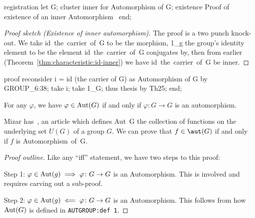 \nwenddocs{}\endmoddef\nwstartdeflinemarkup{}\nwenddeflinemarkup
registration
  let G;
  cluster inner for Automorphism of G;
  existence
  \LA{}Proof of existence of an inner Automorphism~{\nwtagstyle{}}\RA{}
end;
\nwendcode{}\nwdocspar

\begin{proof}[Proof sketch (Existence of inner automorphism)]
The proof is a two punch knock-out. We take {\Tt{}id\ the\ carrier\ of\ G\nwendquote} to be the
morphism, {\Tt{}1{\_}g\nwendquote} the group's identity element to be the element
{\Tt{}id\ the\ carrier\ of\ G\nwendquote} conjugates by, then from earlier (Theorem~\ref{thm:characteristic:id-inner})
we have {\Tt{}id\ the\ carrier\ of\ G\nwendquote} be inner.
\end{proof}

\nwenddocs{}\endmoddef\nwstartdeflinemarkup{}\nwenddeflinemarkup
proof
  reconsider i = id (the carrier of G) as Automorphism of G by GROUP_6:38;
  take i;
  take 1_G;
  thus thesis by Th25;
end;
\nwendcode{}\nwdocspar

\begin{theorem}
For any $\varphi$, we have $\varphi\in\operatorname{Aut}(G)$ if and only if
$\varphi\colon G\to G$ is an automorphism.
\end{theorem}

\begin{thm-remark}
Mizar has~, an article which defines {\Tt{}Aut\ G\nwendquote} the
collection of functions on the underlying set $U(G)$ of a group $G$. We
can prove that $f\in\aut(G)$ if and only if $f$ is {\Tt{}Automorphism\ of\ G\nwendquote}.
\end{thm-remark}

\begin{proof}[Proof outline]
  Like any ``if{}f'' statement, we have two steps to this proof:

  Step 1: $\varphi\in\operatorname{Aut}(g)\implies\varphi\colon G\to G$ is an
  Automorphism. This is involved and requires carving out a sub-proof.

  Step 2: $\varphi\in\operatorname{Aut}(g)\impliedby\varphi\colon G\to G$ is an
  Automorphism. This follows from how $\operatorname{Aut}(G)$ is defined in
  \verb#AUTGROUP:def 1#.
\end{proof}

